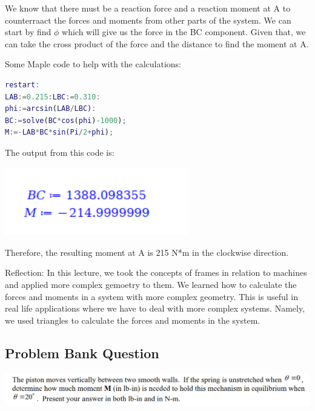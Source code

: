 \documentclass{article}[14pt, letterpaper, Times New Roman]
\begin{document}
We know that there must be a reaction force and a reaction moment at A to counterraact the forces and moments from other parts of the system.
We can start by find $\phi$ which will give us the force in the BC component.
Given that, we can take the cross product of the force and the distance to find the moment at A.

Some Maple code to help with the calculations:

\begin{lstlisting}[language=matlab]
restart:
LAB:=0.215:LBC:=0.310:
phi:=arcsin(LAB/LBC):
BC:=solve(BC*cos(phi)-1000);
M:=-LAB*BC*sin(Pi/2+phi);
\end{lstlisting}

The output from this code is:

\includegraphics[width=8cm]{l10-quiz-o.png}

Therefore, the resulting moment at A is 215 N*m in the clockwise direction.

\medskip

Reflection: In this lecture, we took the concepts of frames in relation to machines and applied more complex gemoetry to them. We learned how to calculate the forces and moments in a system with more complex geometry. This is useful in real life applications where we have to deal with more complex systems. Namely, we used triangles to calculate the forces and moments in the system.

\subsection{Problem Bank Question}

\includegraphics[width=15cm]{l10-pbq1.png}
\end{document}
